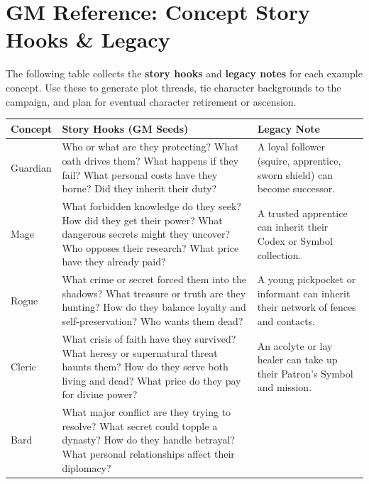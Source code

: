 \clearpage
\section*{GM Reference: Concept Story Hooks \& Legacy}
\label{sec:gm-concept-hooks}

The following table collects the \textbf{story hooks} and \textbf{legacy notes} for each example concept. Use these to generate plot threads, tie character backgrounds to the campaign, and plan for eventual character retirement or ascension.

\begin{longtable}{p{2.5cm} p{6.5cm} p{4cm}}
\toprule
\textbf{Concept} & \textbf{Story Hooks (GM Seeds)} & \textbf{Legacy Note} \\
\midrule
Guardian &
\begin{minipage}[t]{6.5cm}
Who or what are they protecting? What oath drives them? What happens if they fail? What personal costs have they borne? Did they inherit their duty?
\end{minipage} &
A loyal follower (squire, apprentice, sworn shield) can become successor. \\
\midrule
Mage &
\begin{minipage}[t]{6.5cm}
What forbidden knowledge do they seek? How did they get their power? What dangerous secrets might they uncover? Who opposes their research? What price have they already paid?
\end{minipage} &
A trusted apprentice can inherit their Codex or Symbol collection. \\
\midrule
Rogue &
\begin{minipage}[t]{6.5cm}
What crime or secret forced them into the shadows? What treasure or truth are they hunting? How do they balance loyalty and self-preservation? Who wants them dead?
\end{minipage} &
A young pickpocket or informant can inherit their network of fences and contacts. \\
\midrule
Cleric &
\begin{minipage}[t]{6.5cm}
What crisis of faith have they survived? What heresy or supernatural threat haunts them? How do they serve both living and dead? What price do they pay for divine power?
\end{minipage} &
An acolyte or lay healer can take up their Patron's Symbol and mission. \\
\midrule
Bard &
\begin{minipage}[t]{6.5cm}
What major conflict are they trying to resolve? What secret could topple a dynasty? How do they handle betrayal? What personal relationships affect their diplomacy?

\end{minipage}
\end{longtable}
